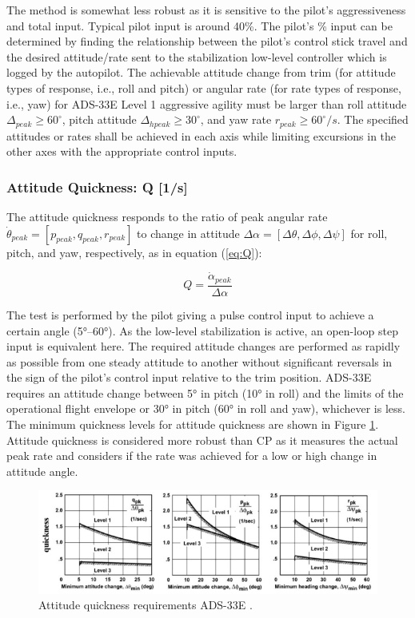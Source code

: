 The method is somewhat less robust as it is sensitive to the pilot’s aggressiveness and total input. Typical pilot input is around 40\%. The pilot’s \% input can be determined by finding the relationship between the pilot’s control stick travel and the desired attitude/rate sent to the stabilization low-level controller which is logged by the autopilot. The achievable attitude change from trim (for attitude types of response, i.e., roll and pitch) or angular rate (for rate types of response, i.e., yaw) for ADS-33E Level 1 aggressive agility must be larger than roll attitude \( \Delta_{peak} \geq 60^\circ \), pitch attitude \( \Delta_{hpeak} \geq 30^\circ \), and yaw rate \( r_{peak} \geq 60^\circ/s \). The specified attitudes or rates shall be achieved in each axis while limiting excursions in the other axes with the appropriate control inputs.

\subsubsection{Attitude Quickness: Q [1/s]}

The attitude quickness responds to the ratio of peak angular rate \( \dot{\theta}_{peak} = [ p_{peak}, q_{peak}, r_{peak} ] \) to change in attitude \( \Delta \alpha = [ \Delta \theta, \Delta \phi, \Delta \psi ] \) for roll, pitch, and yaw, respectively, as in equation (\ref{eq:Q}):

\begin{equation}
    Q = \frac{\dot{\alpha}_{peak}}{\Delta \alpha} \label{eq:Q}
\end{equation}

The test is performed by the pilot giving a pulse control input to achieve a certain angle (5°–60°). As the low-level stabilization is active, an open-loop step input is equivalent here. The required attitude changes are performed as rapidly as possible from one steady attitude to another without significant reversals in the sign of the pilot’s control input relative to the trim position. ADS-33E requires an attitude change between 5° in pitch (10° in roll) and the limits of the operational flight envelope or 30° in pitch (60° in roll and yaw), whichever is less. The minimum quickness levels for attitude quickness are shown in Figure \ref{fig:quickness}. Attitude quickness is considered more robust than CP as it measures the actual peak rate and considers if the rate was achieved for a low or high change in attitude angle.

\begin{figure}
    \centering
    \includegraphics[width=0.95\linewidth]{Images/Attitude quickness requirements.png}
    \caption{Attitude quickness requirements ADS-33E \cite{ADS-33}.}
    \label{fig:quickness}
\end{figure}

